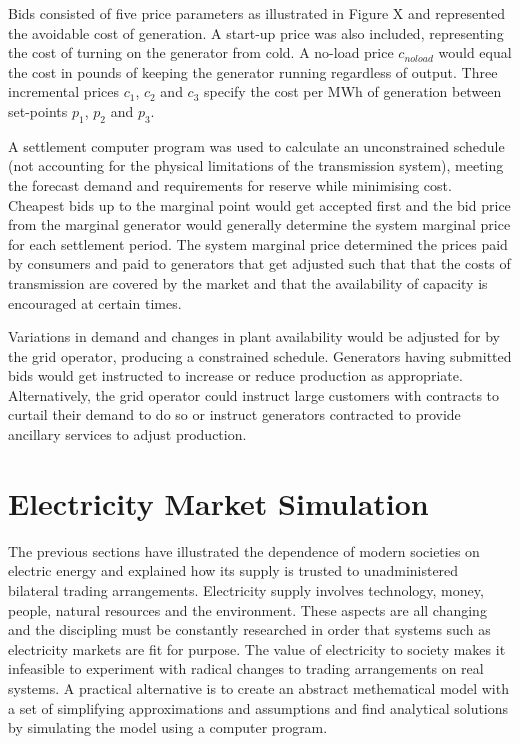 
Bids consisted of five price parameters as illustrated in Figure X and
represented the avoidable cost of generation.  A start-up price was also
included, representing the cost of turning on the generator from cold.  A
no-load price $c_{noload}$ would equal the cost in pounds of keeping the
generator running regardless of output. Three incremental prices $c_1$, $c_2$
and $c_3$ specify the cost per MWh of generation between set-points $p_1$,
$p_2$ and $p_3$.

A settlement computer program was used to calculate an unconstrained schedule
(not accounting for the physical limitations of the transmission system),
meeting the forecast demand and requirements for reserve while minimising cost.
Cheapest bids up to the marginal point would get accepted first and the bid
price from the marginal generator would generally determine the system marginal
price for each settlement period.  The system marginal price determined the
prices paid by consumers and paid to generators that get adjusted such that
that the costs of transmission are covered by the market and that the
availability of capacity is encouraged at certain times.

Variations in demand and changes in plant availability would be adjusted for by
the grid operator, producing a constrained schedule.  Generators having
submitted bids would get instructed to increase or reduce production as
appropriate.  Alternatively, the grid operator could instruct large customers
with contracts to curtail their demand to do so or instruct generators
contracted to provide ancillary services to adjust production.

\section{Electricity Market Simulation}
The previous sections have illustrated the dependence of modern societies on
electric energy and explained how its supply is trusted to unadministered
bilateral trading arrangements.  Electricity supply involves technology, money,
people, natural resources and the environment.  These aspects are all changing
and the discipling must be constantly researched in order that systems such as
electricity markets are fit for purpose.  The value of electricity to society
makes it infeasible to experiment with radical changes to trading arrangements
on real systems.  A practical alternative is to create an abstract methematical
model with a set of simplifying approximations and assumptions and find
analytical solutions by simulating the model using a computer program.

